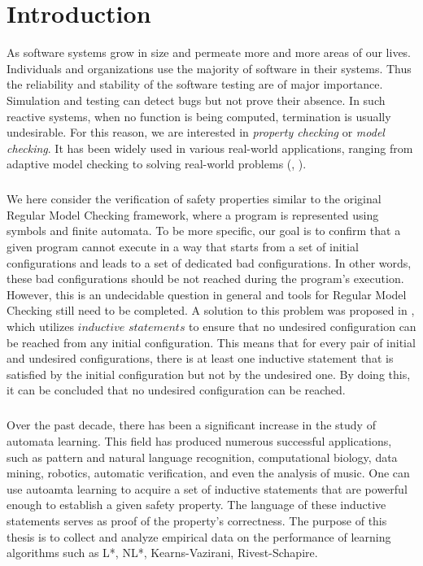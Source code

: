 
\chapter{Introduction}\label{chapter:introduction}
As software systems grow in size and permeate more and more areas of our lives.
Individuals and organizations use the majority of software in their systems. Thus the 
reliability and stability of the software testing are of major importance. Simulation 
and testing can detect bugs but not prove their absence. In such reactive 
systems, when no function is being computed, termination is usually undesirable. For 
this reason, we are interested in \textit{property checking} or \textit{model checking}. 
It has been widely used in various real-world applications, ranging from adaptive 
model checking to solving real-world problems (\cite{faster}, \cite{survey}).
\paragraph*{}
We here consider the verification of safety properties similar to the original 
Regular Model Checking framework, where a program is represented using symbols 
and finite automata.
To be more specific, our goal is to confirm that a given program cannot execute 
in a way that starts from a set of initial configurations and leads to a set 
of dedicated bad configurations. 
In other words, these bad configurations should be not reached during the program's execution. 
However, this is an undecidable question in general and tools for Regular Model Checking 
still need to be completed.
A solution to this problem was proposed in \cite*{Welzel2023InductiveSts}, which utilizes 
$\textit{inductive statements}$ to ensure that no undesired configuration can be reached 
from any initial configuration. This means that for every pair of initial 
and undesired configurations, there is at least one inductive statement that 
is satisfied by the initial configuration but not by the undesired one. 
By doing this, it can be concluded that no undesired configuration can be reached.
\paragraph*{}
Over the past decade, there has been a significant increase in the study of automata learning.
This field has produced numerous successful applications, such as pattern and natural language recognition, 
computational biology, data mining, robotics, automatic verification, and even the analysis of music.
One can use autoamta learning to acquire a set of inductive statements that 
are powerful enough to establish a given safety property. The language of these
inductive statements serves as proof of the property's correctness.
The purpose of this thesis is to collect and analyze empirical data on 
the performance of learning algorithms such as L*, NL*, Kearns-Vazirani, Rivest-Schapire.


